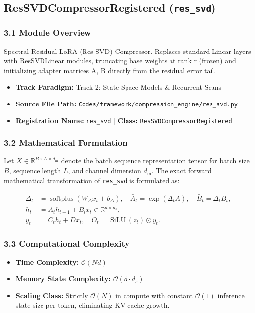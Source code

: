 \subsection{ResSVDCompressorRegistered (\texttt{res\_svd})}
\label{sec:app_module_res_svd}

\subsubsection*{3.1 Module Overview}
Spectral Residual LoRA (Res-SVD) Compressor.  Replaces standard Linear layers with ResSVDLinear modules, truncating base weights at rank r (frozen) and initializing adapter matrices A, B directly from the residual error tail.
\begin{itemize}
    \item \textbf{Track Paradigm:} Track 2: State-Space Models & Recurrent Scans
    \item \textbf{Source File Path:} \texttt{Codes/framework/compression\_engine/res\_svd.py}
    \item \textbf{Registration Name:} \texttt{res\_svd} $\mid$ \textbf{Class:} \texttt{ResSVDCompressorRegistered}
\end{itemize}

\subsubsection*{3.2 Mathematical Formulation}
Let $X \in \mathbb{R}^{B \times L \times d_{\text{in}}}$ denote the batch sequence representation tensor for batch size $B$, sequence length $L$, and channel dimension $d_{\text{in}}$. The exact forward mathematical transformation of \texttt{res\_svd} is formulated as:

\begin{align}
\Delta_t &= \operatorname{softplus}(W_\Delta x_t + b_\Delta), \quad \bar{A}_t = \exp(\Delta_t A), \quad \bar{B}_t = \Delta_t B_t, \\
h_t &= \bar{A}_t h_{t-1} + \bar{B}_t x_t \in \mathbb{R}^{d \times d_s}, \\
y_t &= C_t h_t + D x_t, \quad O_t = \operatorname{SiLU}(z_t) \odot y_t.
\end{align}


\subsubsection*{3.3 Computational Complexity}
\begin{itemize}
    \item \textbf{Time Complexity:} $\mathcal{O}(N d)$
    \item \textbf{Memory State Complexity:} $\mathcal{O}(d \cdot d_s)$
    \item \textbf{Scaling Class:} Strictly $\mathcal{O}(N)$ in compute with constant $\mathcal{O}(1)$ inference state size per token, eliminating KV cache growth.
\end{itemize}

